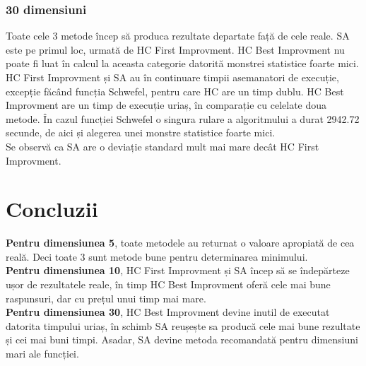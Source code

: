 \documentclass{article}
\begin{document}
\subsubsection{30 dimensiuni}
Toate cele 3 metode încep să produca rezultate departate față de cele reale. SA este pe primul loc, urmată de HC First Improvment. HC Best Improvment nu poate fi luat în calcul la aceasta categorie datorită monstrei statistice foarte mici.\\
HC First Improvment și SA au în continuare timpii asemanatori de execuție, excepție făcând funcția Schwefel, pentru care HC are un timp dublu.
HC Best Improvment are un timp de execuție uriaș, în comparație cu celelate doua metode. În cazul funcției Schwefel o singura rulare a algoritmului a durat 2942.72 secunde, de aici și alegerea unei monstre statistice foarte mici.\\
Se observă ca SA are o deviație standard mult mai mare decât HC First Improvment.


\section{Concluzii}
\textbf{Pentru dimensiunea 5}, toate metodele au returnat o valoare apropiată de cea reală. Deci toate 3 sunt metode bune pentru determinarea minimului.\\
\textbf{Pentru dimensiunea 10}, HC First Improvment și SA încep să se îndepărteze ușor de rezultatele reale, în timp HC Best Improvment oferă cele mai bune raspunsuri, dar cu prețul unui timp mai mare.\\
\textbf{Pentru dimensiunea 30}, HC Best Improvment devine inutil de executat datorita timpului uriaș, în schimb SA reușește sa producă cele mai bune rezultate și cei mai buni timpi. Asadar, SA devine metoda recomandată pentru dimensiuni mari ale funcției.
\end{document}
